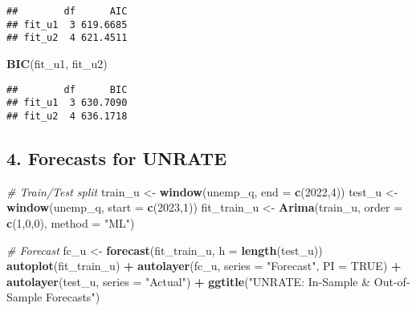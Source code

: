 \documentclass[
]{article}
\newenvironment{Shaded}{\begin{snugshade}}{\end{snugshade}}
\newcommand{\AttributeTok}[1]{\textcolor[rgb]{0.13,0.29,0.53}{#1}}
\newcommand{\CommentTok}[1]{\textcolor[rgb]{0.56,0.35,0.01}{\textit{#1}}}
\newcommand{\ConstantTok}[1]{\textcolor[rgb]{0.56,0.35,0.01}{#1}}
\newcommand{\DecValTok}[1]{\textcolor[rgb]{0.00,0.00,0.81}{#1}}
\newcommand{\FunctionTok}[1]{\textcolor[rgb]{0.13,0.29,0.53}{\textbf{#1}}}
\newcommand{\NormalTok}[1]{#1}
\newcommand{\OtherTok}[1]{\textcolor[rgb]{0.56,0.35,0.01}{#1}}
\newcommand{\SpecialCharTok}[1]{\textcolor[rgb]{0.81,0.36,0.00}{\textbf{#1}}}
\newcommand{\StringTok}[1]{\textcolor[rgb]{0.31,0.60,0.02}{#1}}
\begin{document}
\begin{verbatim}
##        df      AIC
## fit_u1  3 619.6685
## fit_u2  4 621.4511
\end{verbatim}

\begin{Shaded}
\begin{Highlighting}[]
\FunctionTok{BIC}\NormalTok{(fit\_u1, fit\_u2)}
\end{Highlighting}
\end{Shaded}

\begin{verbatim}
##        df      BIC
## fit_u1  3 630.7090
## fit_u2  4 636.1718
\end{verbatim}

\hypertarget{forecasts-for-unrate}{%
\subsection{4. Forecasts for UNRATE}\label{forecasts-for-unrate}}

\begin{Shaded}
\begin{Highlighting}[]
\CommentTok{\# Train/Test split}
\NormalTok{train\_u     }\OtherTok{\textless{}{-}} \FunctionTok{window}\NormalTok{(unemp\_q, }\AttributeTok{end =} \FunctionTok{c}\NormalTok{(}\DecValTok{2022}\NormalTok{,}\DecValTok{4}\NormalTok{))}
\NormalTok{test\_u      }\OtherTok{\textless{}{-}} \FunctionTok{window}\NormalTok{(unemp\_q, }\AttributeTok{start =} \FunctionTok{c}\NormalTok{(}\DecValTok{2023}\NormalTok{,}\DecValTok{1}\NormalTok{))}
\NormalTok{fit\_train\_u }\OtherTok{\textless{}{-}} \FunctionTok{Arima}\NormalTok{(train\_u, }\AttributeTok{order =} \FunctionTok{c}\NormalTok{(}\DecValTok{1}\NormalTok{,}\DecValTok{0}\NormalTok{,}\DecValTok{0}\NormalTok{), }\AttributeTok{method =} \StringTok{"ML"}\NormalTok{)}

\CommentTok{\# Forecast}
\NormalTok{fc\_u }\OtherTok{\textless{}{-}} \FunctionTok{forecast}\NormalTok{(fit\_train\_u, }\AttributeTok{h =} \FunctionTok{length}\NormalTok{(test\_u))}
\FunctionTok{autoplot}\NormalTok{(fit\_train\_u) }\SpecialCharTok{+}
  \FunctionTok{autolayer}\NormalTok{(fc\_u, }\AttributeTok{series =} \StringTok{"Forecast"}\NormalTok{, }\AttributeTok{PI =} \ConstantTok{TRUE}\NormalTok{) }\SpecialCharTok{+}
  \FunctionTok{autolayer}\NormalTok{(test\_u, }\AttributeTok{series =} \StringTok{"Actual"}\NormalTok{) }\SpecialCharTok{+}
  \FunctionTok{ggtitle}\NormalTok{(}\StringTok{"UNRATE: In{-}Sample \& Out{-}of{-}Sample Forecasts"}\NormalTok{)}
\end{Highlighting}
\end{Shaded}
\end{document}
